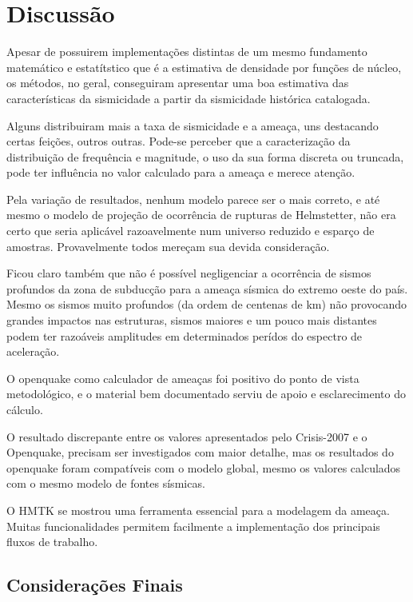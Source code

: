 \chapter{Discussão}
\label{cap:conclusoes}

Apesar de possuirem implementações distintas de um mesmo fundamento matemático e estatítstico
que é a estimativa de densidade por funções de núcleo, os métodos, no geral, conseguiram apresentar
uma boa estimativa das características da sismicidade a partir da sismicidade histórica catalogada.

Alguns distribuiram mais a taxa de sismicidade e a ameaça, uns destacando certas feições, outros outras.
Pode-se perceber que a caracterização da distribuição de frequência e magnitude, o uso da sua forma discreta 
ou truncada, pode ter influência no valor calculado para a ameaça e merece atenção.

Pela variação de resultados, nenhum modelo parece ser o mais correto, e até mesmo 
o modelo de projeção de ocorrência de rupturas de Helmstetter, não era certo que 
seria aplicável razoavelmente num universo reduzido e esparço de amostras.
Provavelmente todos mereçam sua devida consideração.

Ficou claro também que não é possível negligenciar a ocorrência de sismos profundos da zona de subducção
para a ameaça sísmica do extremo oeste do país. Mesmo os sismos muito profundos (da ordem de centenas de km)
não provocando grandes impactos nas estruturas, sismos maiores e um pouco mais distantes podem ter
razoáveis amplitudes em determinados perídos do espectro de aceleração.

O openquake como calculador de ameaças foi positivo do ponto de vista metodológico,
e o material bem documentado serviu de apoio e esclarecimento do cálculo.

O resultado discrepante entre os valores apresentados pelo Crisis-2007 e o Openquake,
precisam ser investigados com maior detalhe, mas os resultados do openquake foram compatíveis com o
modelo global, mesmo os valores calculados com o mesmo modelo de fontes sísmicas.

O HMTK se mostrou uma ferramenta essencial para a modelagem da ameaça. 
Muitas funcionalidades permitem facilmente a implementação dos principais fluxos de trabalho.


\section{Considerações Finais} 

